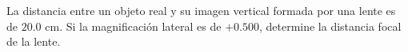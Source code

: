 \item La distancia entre un objeto real y su imagen vertical formada por una lente es de $20.0\text{ cm}$. Si la magnificación lateral es de $+0.500$, determine la distancia focal de la lente.